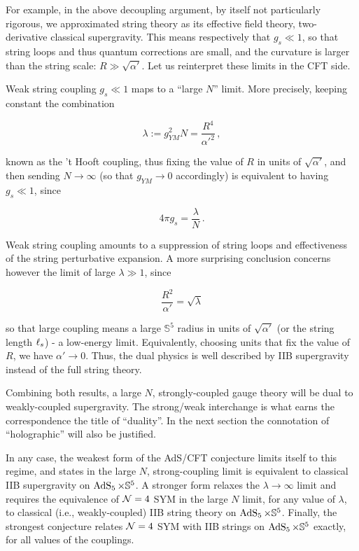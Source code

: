For example, in the above decoupling argument, by itself not particularly rigorous, we approximated string theory as its effective field theory, two-derivative classical supergravity. This means respectively that $g_s \ll 1$, so that string loops and thus quantum corrections are small, and the curvature is larger than the string scale: $R \gg \sqrt {\alpha'}$. Let us reinterpret these limits in the CFT side.

Weak string coupling $g_s \ll 1$ maps to a ``large $N$'' limit. More precisely, keeping constant the combination

\begin{equation}
	\lambda := g_{YM}^2 N = \frac{R^4}{\alpha'^2} \,,
\end{equation}

known as the 't Hooft coupling, thus fixing the value of $R$ in units of $\sqrt{\alpha'}$, and then sending $N \rightarrow \infty$ (so that $g_{YM} \rightarrow 0$ accordingly) is equivalent to having $g_s \ll 1$, since

\begin{equation}
	4\pi g_s = \frac{\lambda}{N}\,.
	\label{}
\end{equation}

Weak string coupling amounts to a suppression of string loops and effectiveness of the string perturbative expansion. A more surprising conclusion concerns however the limit of large $\lambda \gg 1$, since

\begin{equation}
	\frac{R^2}{\alpha'} = \sqrt \lambda
	\label{}
\end{equation}

so that large coupling means a large $\mathbb{S}^5$ radius in units of $\sqrt{\alpha'}$ (or the string length $\ell_s$) - a low-energy limit. Equivalently, choosing units that fix the value of $R$, we have $\alpha' \rightarrow 0$. Thus, the dual physics is well described by IIB supergravity instead of the full string theory.

Combining both results, a large $N$, strongly-coupled gauge theory will be dual to weakly-coupled supergravity. The strong/weak interchange is what earns the correspondence the title of ``duality''. In the next section the connotation of ``holographic'' will also be justified.

In any case, the weakest form of the AdS/CFT conjecture limits itself to this regime, and states \SYM in the large $N$, strong-coupling limit is equivalent to classical IIB supergravity on $\operatorname{AdS}_{5} \times \mathbb{S}^5$. A stronger form relaxes the $\lambda \rightarrow \infty$ limit and requires the equivalence of $\mathcal{N} = 4$ SYM in the large $N$ limit, for any value of $\lambda$, to classical (i.e., weakly-coupled) IIB string theory on $\operatorname{AdS}_{5} \times \mathbb{S}^5$. Finally, the strongest conjecture relates $\mathcal{N}=4$ SYM with IIB strings on $\operatorname{AdS}_{5}\times\mathbb{S}^5$ exactly, for all values of the couplings.

